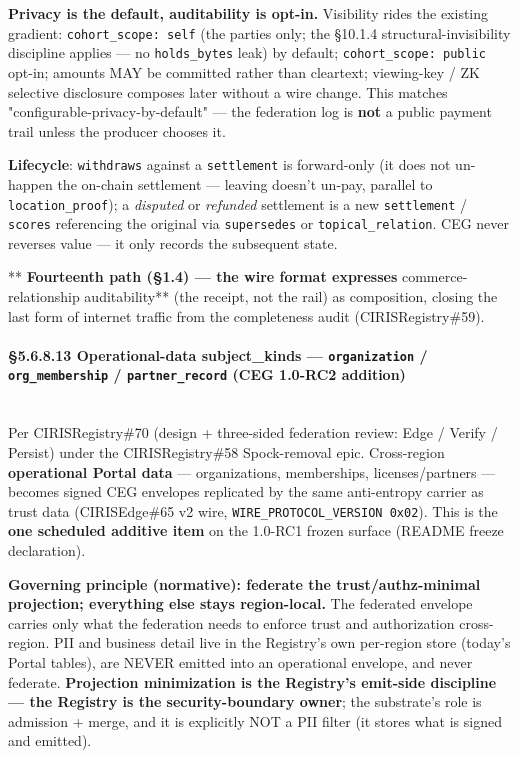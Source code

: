 \documentclass[11pt]{article}
\begin{document}
\textbf{Privacy is the default, auditability is opt-in.} Visibility rides the existing gradient: \texttt{cohort\_scope: self} (the parties only; the §10.1.4 structural-invisibility discipline applies — no \texttt{holds\_bytes} leak) by default; \texttt{cohort\_scope: public} opt-in; amounts MAY be committed rather than cleartext; viewing-key / ZK selective disclosure composes later without a wire change. This matches "configurable-privacy-by-default" — the federation log is \textbf{not} a public payment trail unless the producer chooses it.


\textbf{Lifecycle}: \texttt{withdraws} against a \texttt{settlement} is forward-only (it does not un-happen the on-chain settlement — leaving doesn't un-pay, parallel to \texttt{location\_proof}); a \textit{disputed} or \textit{refunded} settlement is a new \texttt{settlement} / \texttt{scores} referencing the original via \texttt{supersedes} or \texttt{topical\_relation}. CEG never reverses value — it only records the subsequent state.


**\textbf{ Fourteenth path (§1.4) — the wire format expresses }commerce-relationship auditability** (the receipt, not the rail) as composition, closing the last form of internet traffic from the completeness audit (CIRISRegistry\#59).


\paragraph{§5.6.8.13 Operational-data subject\_kinds — \texttt{organization} / \texttt{org\_membership} / \texttt{partner\_record} (CEG 1.0-RC2 addition)}\mbox{}\\


Per CIRISRegistry\#70 (design + three-sided federation review: Edge / Verify / Persist) under the CIRISRegistry\#58 Spock-removal epic. Cross-region \textbf{operational Portal data} — organizations, memberships, licenses/partners — becomes signed CEG envelopes replicated by the same anti-entropy carrier as trust data (CIRISEdge\#65 v2 wire, \texttt{WIRE\_PROTOCOL\_VERSION 0x02}). This is the \textbf{one scheduled additive item} on the 1.0-RC1 frozen surface (README freeze declaration).


\textbf{Governing principle (normative): federate the trust/authz-minimal projection; everything else stays region-local.} The federated envelope carries only what the federation needs to enforce trust and authorization cross-region. PII and business detail live in the Registry's own per-region store (today's Portal tables), are NEVER emitted into an operational envelope, and never federate. \textbf{Projection minimization is the Registry's emit-side discipline — the Registry is the security-boundary owner}; the substrate's role is admission + merge, and it is explicitly NOT a PII filter (it stores what is signed and emitted).
\end{document}
